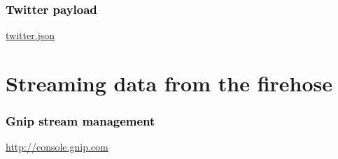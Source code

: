 \documentclass{beamer}
\begin{document}
{
\begin{frame}\frametitle{\textcolor{black} {Twitter payload}}
  \begin{center}
\textcolor{black} {
\Huge \href{run:./twitter_record.html}{twitter.json} }
  \end{center}
\end{frame}
}

\section{Streaming data from the firehose}

{
\begin{frame}\frametitle{\textcolor{black} {Gnip stream management}}
  \begin{center}
\textcolor{black} {
\Huge \href{http://console.gnip.com}{http://console.gnip.com} }
  \end{center}
\end{frame}
}
\end{document}
